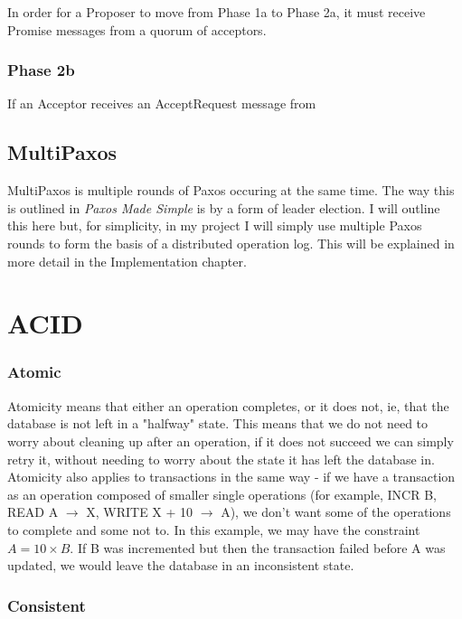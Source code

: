 \documentclass[12pt,twoside,notitlepage]{report}
\begin{document}
In order for a Proposer to move from Phase 1a to Phase 2a, it must receive Promise messages from a
quorum of acceptors.

\subsubsection*{Phase 2b}

If an Acceptor receives an AcceptRequest message from 

\subsection{MultiPaxos}

MultiPaxos is multiple rounds of Paxos occuring at the same time. The way this is outlined in
\emph{Paxos Made Simple} is by a form of leader election. I will outline this here but, for
simplicity, in my project I will simply use multiple Paxos rounds to form the basis of a
distributed operation log. This will be explained in more detail in the Implementation chapter.

\section{ACID}

\subsubsection*{Atomic}

Atomicity means that either an operation completes, or it does not, ie, that the database is not
left in a "halfway" state. This means that we do not need to worry about cleaning up after an
operation, if it does not succeed we can simply retry it, without needing to worry about the state
it has left the database in. Atomicity also applies to transactions in the same way - if we have
a transaction as an operation composed of smaller single operations (for example, INCR B, READ A
$\rightarrow$ X, WRITE X + 10 $\rightarrow$ A), we don't want some of the operations to complete
and some not to. In this example, we may have the constraint $A = 10\times B$. If B was incremented but then
the transaction failed before A was updated, we would leave the database in an inconsistent state.

\subsubsection*{Consistent}
\end{document}
